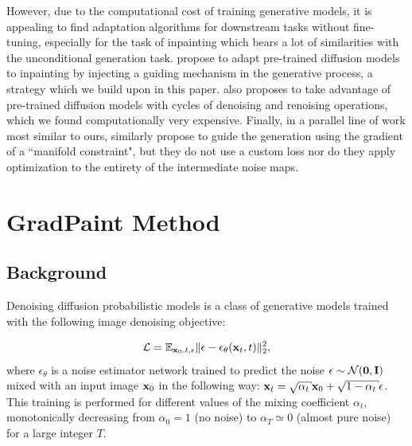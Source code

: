 However, due to the computational cost of training generative models, it is appealing 
to find adaptation algorithms for downstream tasks without fine-tuning, especially for
 the task of inpainting which bears a lot of similarities with the unconditional 
 generation task. \cite{latentdiffusion, glide, song2021scorebased} propose to adapt
  pre-trained diffusion models to inpainting by injecting a guiding mechanism in the 
  generative process, a strategy which we build upon in this paper. \cite{repaint} also
   proposes to take advantage of pre-trained diffusion models with cycles of denoising 
   and renoising operations, which we found computationally very expensive. Finally, 
   in a parallel line of work most similar to ours, \cite{mcg} similarly propose to
    guide the generation using the gradient of a ``manifold constraint", but they do 
    not use a custom loss nor do they apply optimization to the entirety of the 
    intermediate noise maps.



\section{GradPaint Method}



\subsection{Background}
\label{background}

Denoising diffusion probabilistic models \cite{ho2020denoising} is a class of generative models trained with the following image denoising objective:

\begin{equation}
    \mathcal{L} = \displaystyle \mathbb{E}_{\mathbf{x}_0, t, \epsilon} \Vert \epsilon - \epsilon_\theta(\mathbf{x}_t, t) \Vert_2^2,
\end{equation}
where $\epsilon_\theta$ is a noise estimator network trained to predict the noise $\epsilon \sim \mathcal{N}(\mathbf{0}, \mathbf{I})$  mixed with an input image $\mathbf{x}_0$ in the following way: $\x_t = \sqrt{\alpha_t} \x_0 +  \sqrt{1 - \alpha_t} \epsilon$. This training is performed for different values of the mixing coefficient $\alpha_t$, monotonically decreasing from $\alpha_0 = 1$ (no noise) to $\alpha_T \simeq 0$ (almost pure noise) for a large integer $T$.

